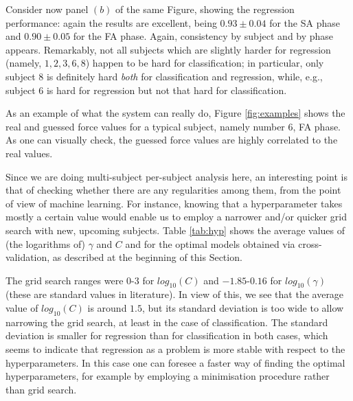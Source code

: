 \documentclass[10pt]{bmc_article}
\def\texttt{[image: ]}
\newenvironment{bmcformat}{\begin{raggedright}\baselineskip20pt\sloppy\setboolean{publ}{false}}{\end{raggedright}\baselineskip20pt\sloppy}
\begin{document}
\begin{bmcformat}
Consider now panel $(b)$ of the same Figure, showing the regression
performance: again the results are excellent, being $0.93
\pm 0.04$ for the SA phase and $0.90 \pm 0.05$ for the FA
phase. Again, consistency by subject and by phase appears. Remarkably,
not all subjects which are slightly harder for regression (namely,
$1,2,3,6,8$) happen to be hard for classification; in particular, only
subject $8$ is definitely hard \emph{both} for classification and
regression, while, e.g., subject $6$ is hard for regression but not
that hard for classification.

As an example of what the system can really do, Figure
\ref{fig:examples} shows the real and guessed force values for a
typical subject, namely number $6$, FA phase. As one can visually
check, the guessed force values are highly correlated to the real
values.


Since we are doing multi-subject per-subject analysis here, an
interesting point is that of checking whether there are any
regularities among them, from the point of view of machine
learning. For instance, knowing that a hyperparameter takes mostly a
certain value would enable us to employ a narrower and/or quicker grid
search with new, upcoming subjects. Table \ref{tab:hyp} shows the
average values of (the logarithms of) $\gamma$ and $C$ and for the
optimal models obtained via cross-validation, as described at the
beginning of this Section.

The grid search ranges were $0$-$3$ for $log_{10}(C)$ and
$-1.85$-$0.16$ for $log_{10}(\gamma)$ (these are standard values in
literature). In view of this, we see that the average value of
$log_{10}(C)$ is around $1.5$, but its standard deviation is too wide
to allow narrowing the grid search, at least in the case of
classification. The standard deviation is smaller for regression than
for classification in both cases, which seems to indicate that
regression as a problem is more stable with respect to the
hyperparameters. In this case one can foresee a faster way of finding
the optimal hyperparameters, for example by employing a minimisation
procedure rather than grid search.


\end{bmcformat}
\end{document}

